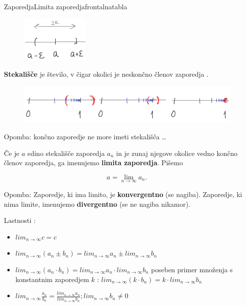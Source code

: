 \begin{priprava}{}{}{Zaporedja}{Limita zaporedja}{frontalna}{tabla}
\begin{figure}[h]
    \centering
    \includegraphics[width=0.3\textwidth]{slike/e_okolica.png}
\end{figure}

\textbf{Stekališče} je število, v čigar okolici  je neskončno členov zaporedja .

\begin{figure}[h]
    \centering
    \includegraphics[width=\textwidth]{slike/e_okolica_primer.png}
\end{figure}

\newpage

Opomba: končno zaporedje ne more imeti stekališča \ldots

Če je $ a $ edino stekališče zaporedja $ a_n $ in je zunaj njegove okolice vedno končno členov zaporedja, ga imenujemo \textbf{limita zaporedja}. Pišemo 

$$ a = \lim_{n \rightarrow \infty} a_n .$$


Opomba: Zaporedje, ki ima limito, je \textbf{konvergentno} (se nagiba). Zaporedje, ki nima limite, imenujemo \textbf{divergentno} (se ne nagiba nikamor).

Lastnosti :
\begin{itemize}
    \item $ lim_{n \rightarrow \infty} c = c $
    \item $ lim_{n \rightarrow \infty} (a_n \pm b_n) = lim_{n \rightarrow \infty} a_n \pm lim_{n \rightarrow \infty} b_n $
    \item $ lim_{n \rightarrow \infty} (a_n \cdot b_n) = lim_{n \rightarrow \infty} a_n \cdot lim_{n \rightarrow \infty} b_n $
        \subitem poseben primer množenja s konstantnim zaporedjem $ k $ : $ lim_{n \rightarrow \infty} (k \cdot b_n) = k \cdot lim_{n \rightarrow \infty} b_n $
    \item $ lim_{n \rightarrow \infty} \frac{a_n}{b_n} = \frac{lim_{n \rightarrow \infty} a_n}{lim_{n \rightarrow \infty} b_n}; lim_{n \rightarrow \infty} b_n \ne 0 $
\end{itemize}


\end{priprava}
